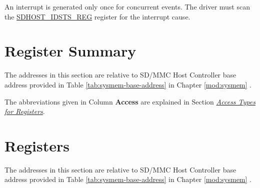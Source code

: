 \documentclass[main\_\_EN.tex]{subfiles}
\begin{document}
An interrupt is generated only once for concurrent events. The driver must scan the \hyperref[regdesc:IDSTSREG]{SDHOST\_IDSTS\_REG} register for the interrupt cause.



\clearpage
\hypertarget{sdhost-reg-summ}{}
\section{Register Summary}
\label{sec:sdhost-reg-summ}

The addresses in this section are relative to SD/MMC Host Controller base address provided in Table \ref{tab:sysmem-base-address} in Chapter \ref{mod:sysmem} \textit{}.

The abbreviations given in Column \textbf{Access} are explained in Section \hyperref[glossary-access-types]{\textit{Access Types for Registers}}.






\clearpage
\section{Registers}

The addresses in this section are relative to SD/MMC Host Controller base address provided in Table \ref{tab:sysmem-base-address} in Chapter \ref{mod:sysmem} \textit{}.


\end{document}
